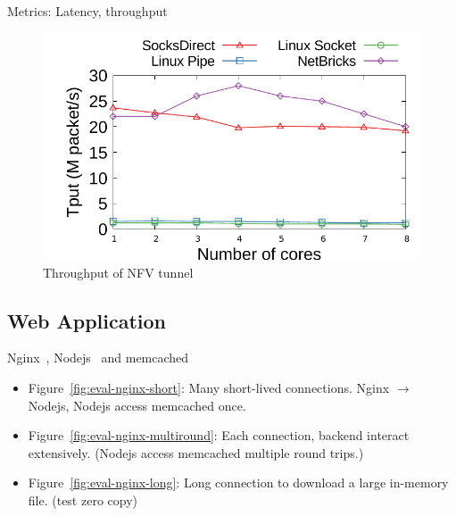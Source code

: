Metrics: Latency, throughput

\begin{figure}[htpb]
	\centering
	\includegraphics[width=\columnwidth]{eval/microbenchmark/nfv-tun-tput.pdf}
	\caption{Throughput of NFV tunnel}
	\label{fig:eval-tun-tput}
\end{figure}



\subsection{Web Application}

Nginx~\cite{nginx}, Nodejs~\cite{nodejs} and memcached~\cite{memcached}

\begin{itemize}
	\item Figure~\ref{fig:eval-nginx-short}: Many short-lived connections. Nginx $\rightarrow$ Nodejs, Nodejs access memcached once.
	\item Figure~\ref{fig:eval-nginx-multiround}: Each connection, backend interact extensively. (Nodejs access memcached multiple round trips.)
	\item Figure~\ref{fig:eval-nginx-long}: Long connection to download a large in-memory file. (test zero copy)
\end{itemize}


